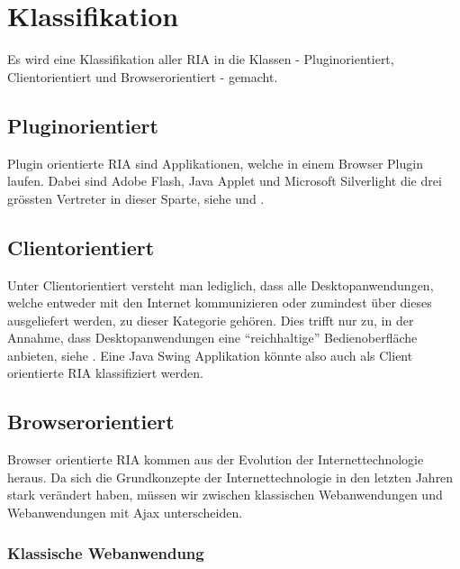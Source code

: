   \section{Klassifikation}
  
  Es wird eine Klassifikation aller \ac{RIA} in die Klassen - Pluginorientiert,
  Clientorientiert und Browserorientiert - gemacht.
  
  \subsection{Pluginorientiert}
  
  Plugin orientierte \ac{RIA} sind Applikationen, welche in einem Browser
  Plugin laufen. Dabei sind Adobe Flash, Java Applet und Microsoft Silverlight
  die drei grössten Vertreter in dieser Sparte, siehe
  \cite{RichInternetApplications} und
  \cite{RichInternetApplicationMarketShare}.

  \subsection{Clientorientiert}
  
  Unter Clientorientiert versteht man lediglich, dass alle Desktopanwendungen,
  welche entweder mit den Internet kommunizieren oder zumindest über dieses
  ausgeliefert werden, zu dieser Kategorie gehören. Dies trifft nur zu, in der
  Annahme, dass Desktopanwendungen eine ``reichhaltige'' Bedienoberfläche
  anbieten, siehe \cite{RichInternetApplication}. Eine Java Swing Applikation
  könnte also auch als Client orientierte \ac{RIA} klassifiziert werden.
  
  \subsection{Browserorientiert}
  
  Browser orientierte \ac{RIA} kommen aus der Evolution der Internettechnologie
  heraus. Da sich die Grundkonzepte der Internettechnologie in den letzten
  Jahren stark verändert haben, müssen wir zwischen klassischen Webanwendungen
  und Webanwendungen mit Ajax unterscheiden.
  
  \clearpage
  
  \subsubsection{Klassische Webanwendung}
  
